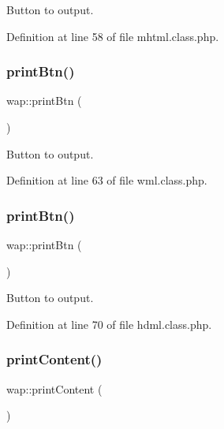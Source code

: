 Button to output. 



Definition at line 58 of file mhtml.\+class.\+php.

\mbox{\label{classwap_a47437aad53e77ce53aebb4db6240cc38}} 
\subsubsection{\texorpdfstring{print\+Btn()}{printBtn()}\hspace{0.1cm}{\footnotesize\ttfamily [2/3]}}
{\footnotesize\ttfamily wap\+::print\+Btn (\begin{DoxyParamCaption}{ }\end{DoxyParamCaption})}



Button to output. 



Definition at line 63 of file wml.\+class.\+php.

\mbox{\label{classwap_a47437aad53e77ce53aebb4db6240cc38}} 
\subsubsection{\texorpdfstring{print\+Btn()}{printBtn()}\hspace{0.1cm}{\footnotesize\ttfamily [3/3]}}
{\footnotesize\ttfamily wap\+::print\+Btn (\begin{DoxyParamCaption}{ }\end{DoxyParamCaption})}



Button to output. 



Definition at line 70 of file hdml.\+class.\+php.

\mbox{\label{classwap_a1edebe2b6a90ec08ab149ad2b2866dbd}} 
\subsubsection{\texorpdfstring{print\+Content()}{printContent()}\hspace{0.1cm}{\footnotesize\ttfamily [1/3]}}
{\footnotesize\ttfamily wap\+::print\+Content (\begin{DoxyParamCaption}{ }\end{DoxyParamCaption})}



